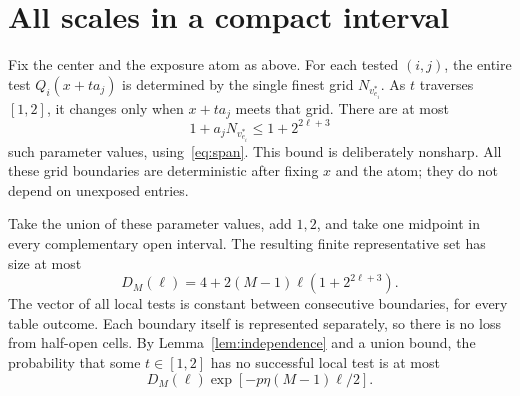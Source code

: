 \documentclass[11pt]{article}
\theoremstyle{remark}\newtheorem{remark}[theorem]{Remark}
\begin{document}
\section{All scales in a compact interval}
Fix the center and the exposure atom as above. For each tested $(i,j)$, the entire test $Q_i(x+t a_j)$ is determined by the single finest grid $N_{v_{e_i}^*}$. As $t$ traverses $[1,2]$, it changes only when $x+t a_j$ meets that grid. There are at most
\[
 1+a_j N_{v_{e_i}^*}\le1+2^{2\ell+3}
\]
such parameter values, using~\eqref{eq:span}. This bound is deliberately nonsharp. All these grid boundaries are deterministic after fixing $x$ and the atom; they do not depend on unexposed entries.

Take the union of these parameter values, add $1,2$, and take one midpoint in every complementary open interval. The resulting finite representative set has size at most
\begin{equation}\label{eq:entropy}
 D_M(\ell)=4+2(M-1)\ell(1+2^{2\ell+3}).
\end{equation}
The vector of all local tests is constant between consecutive boundaries, for every table outcome. Each boundary itself is represented separately, so there is no loss from half-open cells. By Lemma~\ref{lem:independence} and a union bound, the probability that some $t\in[1,2]$ has no successful local test is at most
\begin{equation}\label{eq:miss}
 D_M(\ell)\exp[-p\eta(M-1)\ell/2].
\end{equation}
\end{document}
